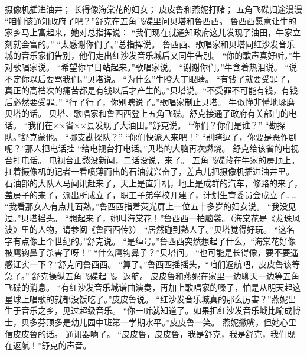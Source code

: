 \documentclass[a4paper,12pt,UTF8,twoside]{ctexbook}
\begin{document}
        摄像机插进油井；  
        长得像海棠花的妇女；  
        皮皮鲁和燕妮打赌；  
        五角飞碟归途漫漫   
        “咱们该通知政府了吧？”舒克在五角飞碟里问贝塔和鲁西西。  
        鲁西西愿意让牛的家乡马上富起来，她对总指挥说：  
        “我们现在就通知政府这儿发现了油田，牛家立刻就会富的。”  
        “太感谢你们了。”总指挥说。  
        鲁西西、歌唱家和贝塔同红沙发音乐城的音乐家们告别，他们走出红沙发音乐城后又同牛告别。  
        “你的歌声真好听。”牛对歌唱家说。  
        “希望你早日站起来。”歌唱家说。        
        “谢谢你们。”牛含着热泪说。  
        “说不定你以后要骂我们。”贝塔说。  
        “为什么”牛瞪大丁眼睛。  
        “有钱了就要受罪了，真正的高档次的痛苦都是有钱以后才产生的。”贝塔说。“不受罪不可能有钱，有钱后必然要受罪。”  
        “行了行了，你别瞎说了。”歌唱家制止贝塔。  
        牛似懂非懂地琢磨贝塔的话。  
        贝塔、歌唱家和鲁西西登上五角飞碟。舒克接通了政府有关部门的电话。  
        “我们在××省××县发现了大油田。”舒克说。  
        “你们？你们是谁？”  
        “勘探队。”舒克蒙他。  
        “哪支勘探队？”  
        “你们快派人来吧！”  
        “别瞎逗了，你要是恶作剧呢？”那人把电话挂  
        “给电视台打电话。”贝塔的大脑再次燃烧。  
        舒克给该省的电视台打电话。  
        电视台正愁没新闻，二话没说，来了。  
        五角飞碟藏在牛家的房顶上。  
        扛着摄像机的记者一看喷薄而出的石油就兴奋了，差点儿把摄像机插进油井里。  
        石油部的大队人马闻讯赶来了，天上是直升机，地上是成群的汽车，修路的来了，盖房子的来了，派出所成立了，职工子弟学校开建了，计划生育委员会成立了……  
        “我看那女人有点儿面熟。”鲁西西指着荧光屏上一位五十多岁的妇女说。  
        “我没见过。”贝塔摇头。  
        “想起来了，她叫海棠花！”鲁西西一拍脑袋。（海棠花是《龙珠风波》里的人物，请参阅《鲁西西传》）  
        “居然碰到熟人了。”贝塔觉得好玩。  
        “这名字有点像上个世纪的。”舒克说。  
        “是绰号。”鲁西西突然想起了什么，“海棠花好像被鹰钩鼻子杀害了呀！”  
        “什么鹰钩鼻子？”贝塔问。  
        “也可能是长得像，要不要遥感证实一下？”舒克问鲁西西。  
        “算了。”鲁西西摇摇头，“咱们返航吧，皮皮鲁该等急了。”  
        舒克操纵五角飞碟起飞。返航。  
        皮皮鲁和燕妮在家里一边聊天一边等五角飞碟的消息。  
        “有红沙发音乐城谱曲演奏，再加上歌唱家的嗓子，怕是从明天起这星球上唱歌的就都没饭吃了。”皮皮鲁说。        
        “红沙发音乐城真的那么厉害？”燕妮出生于音乐之乡，见过超级音乐。  
        “你一听就知道了。如果把红沙发音乐城比喻成博士，贝多芬顶多是幼儿园中班第一学期水平。”皮皮鲁一笑。  
        燕妮撇嘴，但她心里信皮皮鲁的话。  
        通讯器响了。  
        “皮皮鲁，皮皮鲁，我是舒克，我是舒克，我们现在返航！”舒克的声音。  
\end{document}
